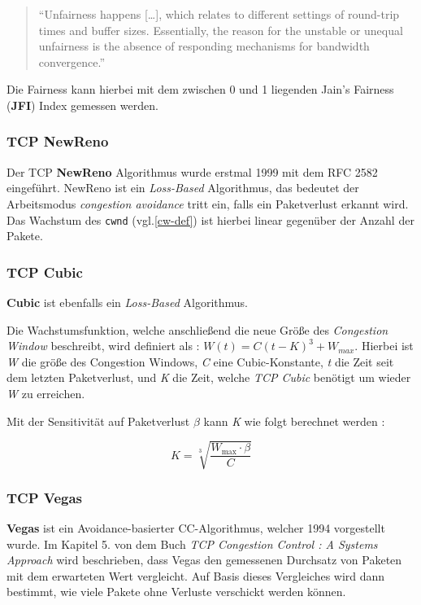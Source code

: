 \documentclass[paper=a4,fontsize=12pt,ngerman]{scrartcl}
\begin{document}

\begin{quote}
``Unfairness happens [\dots], which relates to different settings of round-trip times and buffer sizes.
Essentially, the reason for the unstable or unequal unfairness is the absence of responding mechanisms for bandwidth convergence.''\cite{tang24BBRns3}
\end{quote}
 

Die Fairness kann hierbei mit dem zwischen 0 und 1 liegenden Jain's Fairness (\textbf{JFI}) Index gemessen werden.\cite{DBLP:journals/corr/cs-NI-9809099}

\subsubsection{TCP NewReno}
Der TCP \textbf{NewReno} Algorithmus wurde erstmal 1999 mit dem RFC 2582 eingeführt.\cite{rfc2582}
NewReno ist ein \textit{Loss-Based} Algorithmus, das bedeutet der
Arbeitsmodus \textit{congestion avoidance} tritt ein, falls ein Paketverlust erkannt wird.
Das Wachstum des \texttt{cwnd} (vgl.\ref{cw-def})  ist hierbei linear gegenüber der Anzahl der Pakete.


\subsubsection{TCP Cubic}
\textbf{Cubic} ist ebenfalls ein \textit{Loss-Based} Algorithmus.

Die Wachstumsfunktion, welche anschließend die neue Größe des \textit{Congestion Window}
beschreibt, wird definiert als : $ W(t) = C(t-K)^3 + W_{max}$.  
Hierbei ist \textit{W} die größe des Congestion Windows, \textit{C} eine Cubic-Konstante, 
\textit{t} die Zeit seit dem letzten Paketverlust, und \textit{K} die Zeit, welche \textit{TCP Cubic} benötigt 
um wieder \textit{W} zu erreichen.

Mit der Sensitivität auf Paketverlust $\beta$ kann \textit{K} wie folgt berechnet werden \cite{HArheeInjXuCUBIC} :

\[
K = \sqrt[3]{\frac{W_{\text{max}} \cdot \beta}{C}}     
\]


\subsubsection{TCP Vegas}
\textbf{Vegas} ist ein Avoidance-basierter CC-Algorithmus, welcher 1994 vorgestellt wurde.
Im Kapitel 5. von dem Buch \textit{TCP Congestion Control : A Systems Approach} wird beschrieben, dass Vegas den gemessenen Durchsatz 
von Paketen mit dem erwarteten Wert vergleicht. \cite{tcpccCh5}
Auf Basis dieses Vergleiches wird dann bestimmt, wie viele Pakete ohne Verluste verschickt werden können.
\end{document}
